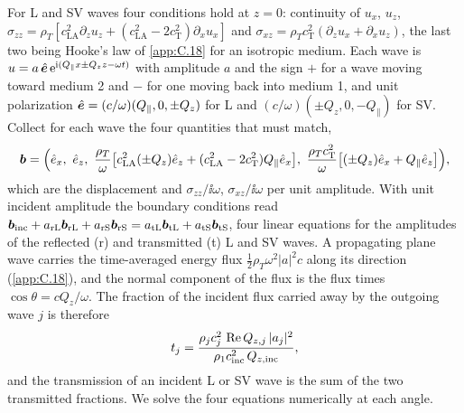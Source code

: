 For L and SV waves four conditions hold at $z = 0$: continuity of $u_x$, $u_z$, $\sigma_{zz} = \rho_T[c_{\mathrm{LA}}^2\partial_zu_z + (c_{\mathrm{LA}}^2 - 2c_{\mathrm{T}}^2)\partial_xu_x]$ and $\sigma_{xz} = \rho_Tc_{\mathrm{T}}^2(\partial_zu_x + \partial_xu_z)$, the last two being Hooke's law of \cref{app:C.18} for an isotropic medium. Each wave is $u = a\,\hat{\bm{e}}\,\mathrm{e}^{\mathrm{i}(Q_\parallel x \pm Q_zz - \omega t)}$ with amplitude $a$ and the sign $+$ for a wave moving toward medium 2 and $-$ for one moving back into medium 1, and unit polarization $\hat{\bm{e}} = (c/\omega)(Q_\parallel, 0, \pm Q_z)$ for L and $(c/\omega)(\pm Q_z, 0, -Q_\parallel)$ for SV. Collect for each wave the four quantities that must match,
\begin{equation}
  \vect{b} = \Bigl(\hat e_x,\ \hat e_z,\ \frac{\rho_T}{\omega}\bigl[c_{\mathrm{LA}}^2(\pm Q_z)\hat e_z + (c_{\mathrm{LA}}^2 - 2c_{\mathrm{T}}^2)Q_\parallel\hat e_x\bigr],\ \frac{\rho_Tc_{\mathrm{T}}^2}{\omega}\bigl[(\pm Q_z)\hat e_x + Q_\parallel\hat e_z\bigr]\Bigr) ,
  \label{eq:20.3-b}
\end{equation}
which are the displacement and $\sigma_{zz}/\ii\omega$, $\sigma_{xz}/\ii\omega$ per unit amplitude. With unit incident amplitude the boundary conditions read $\bm{b}_{\mathrm{inc}} + a_{\mathrm{rL}}\bm{b}_{\mathrm{rL}} + a_{\mathrm{rS}}\bm{b}_{\mathrm{rS}} = a_{\mathrm{tL}}\bm{b}_{\mathrm{tL}} + a_{\mathrm{tS}}\bm{b}_{\mathrm{tS}}$, four linear equations for the amplitudes of the reflected (r) and transmitted (t) L and SV waves. A propagating plane wave carries the time-averaged energy flux $\frac12\rho_T\omega^2|a|^2c$ along its direction (\cref{app:C.18}), and the normal component of the flux is the flux times $\cos\theta = cQ_z/\omega$. The fraction of the incident flux carried away by the outgoing wave $j$ is therefore
\begin{equation}
  t_j = \frac{\rho_jc_j^2\,\operatorname{Re} Q_{z,j}\,|a_j|^2}{\rho_1c_{\mathrm{inc}}^2\,Q_{z,\mathrm{inc}}} ,
  \label{eq:20.3-flux}
\end{equation}
and the transmission of an incident L or SV wave is the sum of the two transmitted fractions. We solve the four equations numerically at each angle.

